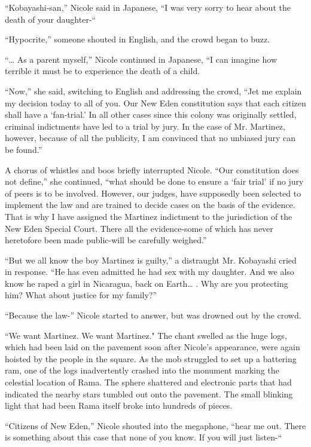 \documentclass[]{article}
\begin{document}
{“Kobayashi-san,” Nicole said in Japanese, “I was very sorry to hear about the death of your daughter-“

“Hypocrite,” someone shouted in English, and the crowd began to buzz.

“… As a parent myself,” Nicole continued in Japanese, “I can imagine how terrible it must be to experience the death of a child.

“Now,” she said, switching to English and addressing the crowd, “Jet me explain my decision today to all of you.  Our New Eden constitution says that each citizen shall have a ‘fan-trial.’ In all other cases since this colony was originally settled, criminal indictments have led to a trial by jury.  In the case of Mr.  Martinez, however, because of all the publicity, I am convinced that no unbiased jury can be found.”

A chorus of whistles and boos briefly interrupted Nicole.  “Our constitution does not define,” she continued, “what should be done to ensure a ‘fair trial’ if no jury of peers is to be involved.  However, our judges, have supposedly been selected to implement the law and are trained to decide cases on the basis of the evidence.  That is why I have assigned the Martinez indictment to the jurisdiction of the New Eden Special Court.  There all the evidence-some of which has never heretofore been made public-will be carefully weighed.”

“But we all know the boy Martinez is guilty,” a distraught Mr.  Kobayashi cried in response.  “He has even admitted he had sex with my daughter.  And we also know he raped a girl in Nicaragua, back on Earth… .  Why are you protecting him? What about justice for my family?”

“Because the law-” Nicole started to answer, but was drowned out by the crowd.

“We want Martinez.  We want Martinez."  The chant swelled as the huge logs, which had been laid on the pavement soon after Nicole’s appearance, were again hoisted by the people in the square.  As the mob struggled to set up a battering ram, one of the logs inadvertently crashed into the monument marking the celestial location of Rama.  The sphere shattered and electronic parts that had indicated the nearby stars tumbled out onto the pavement.  The small blinking light that had been Rama itself broke into hundreds of pieces.

“Citizens of New Eden,” Nicole shouted into the megaphone, “hear me out.  There is something about this case that none of you know.  If you will just listen-“

}
\end{document}
